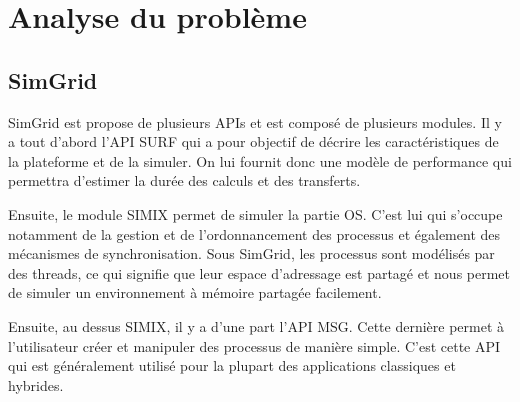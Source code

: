 \documentclass[smallextended]{svjour3}
\begin{document}
\section{Analyse du problème}
\label{sec-3}
\subsection{SimGrid}
\label{sec-3-1}
SimGrid est propose de plusieurs APIs et est composé de plusieurs
modules. Il y a tout d'abord l'API SURF qui a pour objectif de
décrire les caractéristiques de la plateforme et de la simuler. On
lui fournit donc une modèle de performance qui permettra d'estimer
la durée des calculs et des transferts.

Ensuite, le module SIMIX permet de simuler la partie OS. C'est lui
qui s'occupe notamment de la gestion et de l'ordonnancement des
processus et également des mécanismes de synchronisation. Sous
SimGrid, les processus sont modélisés par des threads, ce qui
signifie que leur espace d'adressage est partagé et nous permet
de simuler un environnement à mémoire partagée facilement. 

Ensuite, au dessus SIMIX, il y a d'une part l'API MSG. Cette dernière
permet à l'utilisateur créer et manipuler des processus de manière
simple. C'est cette API qui est généralement utilisé pour la
plupart des applications classiques et hybrides. 
\end{document}
